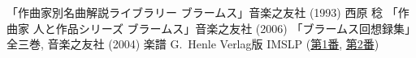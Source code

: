 
\begin{thebibliography}{99}
	 「作曲家別名曲解説ライブラリー ブラームス」音楽之友社 (1993)
	 西原 稔 「作曲家 人と作品シリーズ ブラームス」音楽之友社 (2006)
	 「ブラームス回想録集」全三巻, 音楽之友社 (2004)
	 楽譜 G.~Henle Verlag版
	 IMSLP (\href{http://imslp.org/wiki/Clarinet_Sonata_No.1,_Op.120_No.1_(Brahms,_Johannes)}{第1番}, 
		\href{http://imslp.org/wiki/Clarinet_Sonata_No.2,_Op.120_No.2_(Brahms,_Johannes)}{第2番})
\end{thebibliography}
